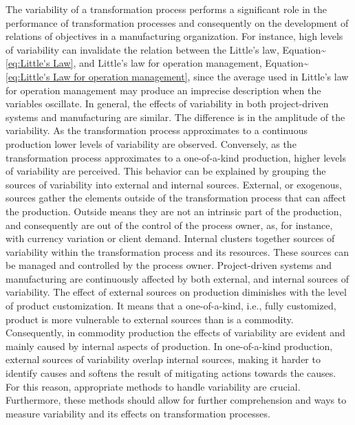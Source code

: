 \documentclass{article}
\begin{document}
The variability of a transformation process performs a significant role in the performance of transformation processes and consequently on the development of relations of objectives in a manufacturing organization.
For instance, high levels of variability can invalidate the relation between the Little's law, Equation\textasciitilde{}\ref{eq:Little's Law}, and Little's law for operation management, Equation\textasciitilde{}\ref{eq:Little's Law for operation management}, since the average used in Little's law for operation management may produce an imprecise description when the variables oscillate.
In general, the effects of variability in both project-driven systems and manufacturing are similar.
The difference is in the amplitude of the variability.
As the transformation process approximates to a continuous production lower levels of variability are observed.
Conversely, as the transformation process approximates to a one-of-a-kind production, higher levels of variability are perceived.
This behavior can be explained by grouping the sources of variability into external and internal sources.
External, or exogenous, sources gather the elements outside of the transformation process that can affect the production.
Outside means they are not an intrinsic part of the production, and consequently are out of the control of the process owner, as, for instance, with currency variation or client demand.
Internal clusters together sources of variability within the transformation process and its resources.
These sources can be managed and controlled by the process owner.
Project-driven systems and manufacturing are continuously affected by both external, and internal sources of variability.
The effect of external sources on production diminishes with the level of product customization.
It means that a one-of-a-kind, i.e., fully customized, product is more vulnerable to external sources than is a commodity.
Consequently, in commodity production the effects of variability are evident and mainly caused by internal aspects of production.
In one-of-a-kind production, external sources of variability overlap internal sources, making it harder to identify causes and softens the result of mitigating actions towards the causes.
For this reason, appropriate methods to handle variability are crucial.
Furthermore, these methods should allow for further comprehension and ways to measure variability and its effects on transformation processes.
\end{document}
